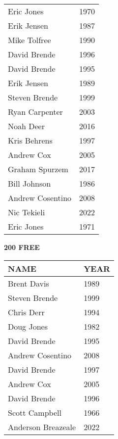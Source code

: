 \begin{table}[H]
\begin{minipage}[t]{0.48\textwidth}
\begin{tabular}{@{}p{2.8cm}p{1.2cm}@{}}
\hline
    Eric Jones & 1970 \\
    Erik Jensen & 1987 \\
    Mike Tolfree & 1990 \\
    David Brende & 1996 \\
    David Brende & 1995 \\
    Erik Jensen & 1989 \\
    Steven Brende & 1999 \\
    Ryan Carpenter & 2003 \\
    Noah Deer & 2016 \\
    Kris Behrens & 1997 \\
    Andrew Cox & 2005 \\
    Graham Spurzem & 2017 \\
    Bill Johnson & 1986 \\
    Andrew Cosentino & 2008 \\
    Nic Tekieli & 2022 \\
    Eric Jones & 1971 \\
\hline
\end{tabular}
\end{minipage}
\end{table}

\begin{table}[H]
\centering
\begin{minipage}[t]{0.6\textwidth}
\centering
\textbf{200 FREE}\\[0.1cm]
\begin{tabular}{@{}p{2.8cm}p{1.2cm}@{}}
\hline
    \textbf{NAME} & \textbf{YEAR} \\
\hline
    Brent Davis & 1989 \\
    Steven Brende & 1999 \\
    Chris Derr & 1994 \\
    Doug Jones & 1982 \\
    David Brende & 1995 \\
    Andrew Cosentino & 2008 \\
    David Brende & 1997 \\
    Andrew Cox & 2005 \\
    David Brende & 1996 \\
    Scott Campbell & 1966 \\
    Anderson Breazeale & 2022 \\
\hline
\end{tabular}
\end{minipage}
\end{table}

